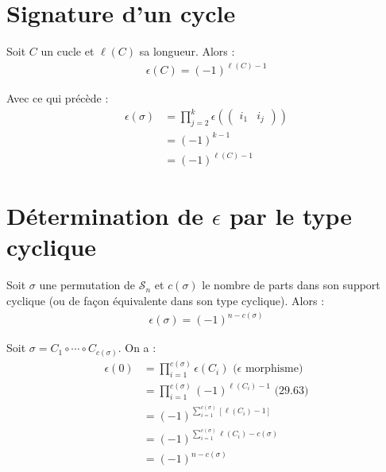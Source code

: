 \documentclass[../main.tex]{subfiles}
\begin{document}
\section{Signature d'un cycle}
\begin{tcolorbox}[title=Propostion 29.63, title filled=false, colframe=lightblue, colback=lightblue!10!white]
    Soit $C$ un cucle et $\ell(C)$ sa longueur. Alors : 
    \begin{align*}
        \epsilon(C) = (-1)^{\ell(C) - 1}
    \end{align*}
\end{tcolorbox}

\noindent Avec ce qui précède : 
\begin{align*}
    \epsilon(\sigma) &= \prod_{j=2}^{k} \epsilon(\begin{pmatrix}
        i_1 & i_j
    \end{pmatrix}) \\
    &= (-1)^{k-1} \\
    &= (-1)^{\ell(C) - 1}
\end{align*}

\section{Détermination de $\epsilon$ par le type cyclique}
\begin{tcolorbox}[title=Théorème 29.64, title filled=false, colframe=orange, colback=orange!10!white]
    Soit $\sigma$ une permutation de $\mathcal{S}_n$ et $c(\sigma)$ le nombre de parts dans son support cyclique (ou de façon équivalente dans son type cyclique). Alors : 
    \begin{align*}
        \epsilon(\sigma) = (-1)^{n - c(\sigma)}
    \end{align*}
\end{tcolorbox}

\noindent Soit $\sigma = C_1\circ \cdots\circ C_{c(\sigma)}$. On a : 
\begin{align*}
    \epsilon(0) &= \prod_{i=1}^{c(\sigma)} \epsilon(C_i) \text{ ($\epsilon$ morphisme)} \\
    &= \prod_{i=1}^{c(\sigma)} (-1)^{\ell(C_i) - 1} \text{ (29.63)} \\
    &= (-1)^{\sum\limits_{i=1}^{c(\sigma)} [\ell(C_i) - 1]} \\
    &= (-1)^{\sum\limits_{i=1}^{c(\sigma)} \ell(C_i) - c(\sigma)} \\
    &= (-1)^{n - c(\sigma)}
\end{align*}
\end{document}
